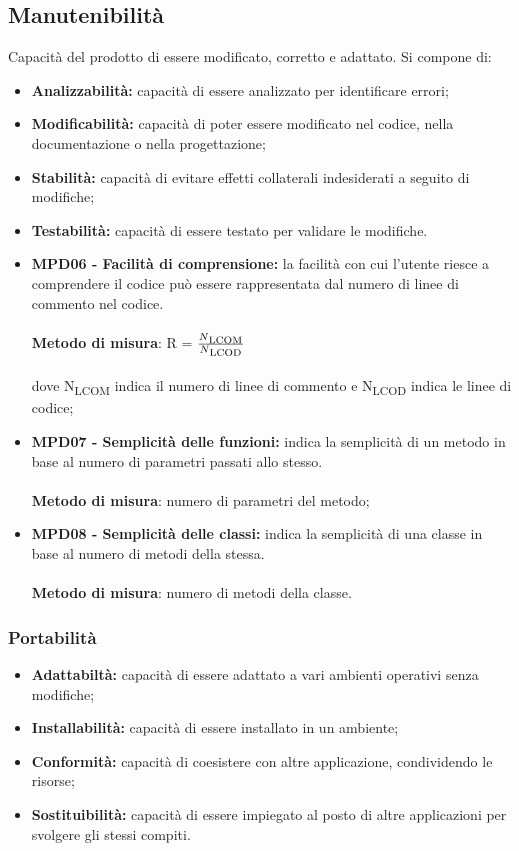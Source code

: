 \subsection{Manutenibilità}
Capacità del prodotto di essere modificato, corretto e adattato. Si compone di:
\begin{itemize}
    \item \textbf{Analizzabilità: }capacità di essere analizzato per identificare errori;
    \item \textbf{Modificabilità: }capacità di poter essere modificato nel codice, nella documentazione o nella progettazione;
    \item \textbf{Stabilità: }capacità di evitare effetti collaterali indesiderati a seguito di modifiche;
    \item \textbf{Testabilità: }capacità di essere testato per validare le modifiche.
\end{itemize}
\begin{itemize}
    \item \textbf{MPD06 - Facilità di comprensione:} la facilità con cui l'utente riesce a comprendere il codice può essere rappresentata dal numero di linee di commento nel codice.\\
    \\\textbf{Metodo di misura}: R = $\frac{N\textsubscript{LCOM}}{N\textsubscript{LCOD}}$ \\
    \\dove N\textsubscript{LCOM} indica il numero di linee di commento e N\textsubscript{LCOD} indica le linee di codice;
    \item \textbf{MPD07 - Semplicità delle funzioni:} indica la semplicità di un metodo in base al numero di parametri passati allo stesso.\\
    \\\textbf{Metodo di misura}: numero di parametri del metodo;
    \item \textbf{MPD08 - Semplicità delle classi:}  indica la semplicità di una classe in base al numero di metodi della stessa.\\
    \\\textbf{Metodo di misura}: numero di metodi della classe.
\end{itemize}
\subsubsection{Portabilità}
\begin{itemize}
    \item \textbf{Adattabiltà: }capacità di essere adattato a vari ambienti operativi senza modifiche;
    \item \textbf{Installabilità: }capacità di essere installato in un ambiente;
    \item \textbf{Conformità: }capacità di coesistere con altre applicazione, condividendo le risorse;
    \item \textbf{Sostituibilità: }capacità di essere impiegato al posto di altre applicazioni per svolgere gli stessi compiti.
\end{itemize}





 


